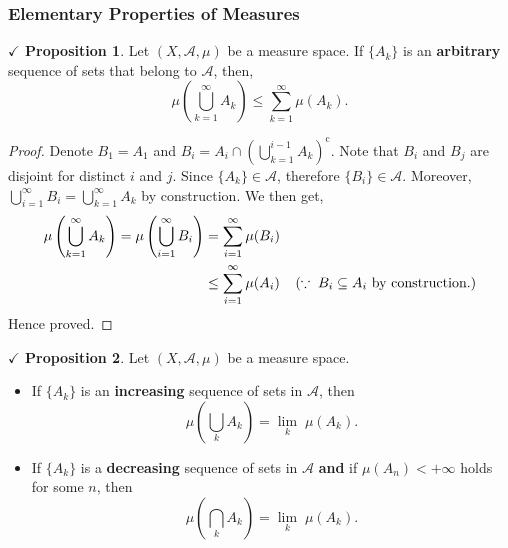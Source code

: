 \documentclass{article}
\theoremstyle{definition}
\theoremstyle{remark}
\theoremstyle{definition}
\theoremstyle{definition}
\newtheorem{proposition}{$\checkmark$ Proposition}
\theoremstyle{definition}
\newcommand{\intrs}{\cap}
\newcommand{\bunion}{\bigcup}
\newcommand{\bintrs}{\bigcap}
\newcommand{\alg}[1]{\mathscr{#1}}
\newcommand{\comp}[1]{#1^{\text{c}}}
\newcommand{\m}[1]{\mu\left (#1\right )}
\newcommand{\limit}[2]{\underset{#1}{\lim}\; #2}
\begin{document}
\subsubsection{Elementary Properties of Measures}
\begin{proposition}
	\label{P-6}
	Let $ (X,\alg{A}, \mu) $ be a measure space. If $ \{A_k\} $ is an \textbf{arbitrary} sequence of sets that belong to $ \alg{A} $, then,
	\[\mu\left (\bunion_{k=1}^\infty A_k\right) \le \sum_{k=1}^\infty \mu(A_k).\]
\end{proposition}
\begin{proof}
	Denote $ B_1 = A_1 $ and $ B_i = A_i \intrs \comp{\left (\bunion_{k=1}^{i-1} A_k \right)} $. Note that $ B_i $ and $ B_j $ are disjoint for distinct $ i $ and $ j $. Since $ \{A_k\}\in \alg{A} $, therefore $ \{B_i\} \in \alg{A}$. Moreover, $ \bunion_{i=1}^{\infty} B_i = \bunion_{k=1}^\infty A_k $ by construction. We then get,
	\begin{equation*}
		\begin{split}
			\mu\left (\bunion_{k=1}^\infty A_k\right ) = \mu\left (\bunion_{i=1}^\infty B_i\right ) &= \sum_{i=1}^\infty \mu(B_i)\\
			&\le \sum_{i=1}^\infty \mu(A_i)\;\;\;\;\text{($ \because \;B_i \subseteq A_i$ by construction.)}
		\end{split}
	\end{equation*}
Hence proved.
\end{proof}
\hrulefill
\newpage
\begin{proposition}
	\label{P-7}
	Let $ (X,\alg{A},\mu) $ be a measure space.
	\begin{itemize}
		\item {If $ \{A_k\} $ is an \textbf{increasing} sequence of sets in $ \alg{A} $, then
	\[\m{\bunion_{k}A_k} = \limit{k}{\m{A_k}}.\]	
	}
\item {If $ \{A_k\} $ is a \textbf{decreasing} sequence of sets in $ \alg{A} $ \textbf{and} if $ \m{A_n} < + \infty$ holds for some $ n $, then
\[\m{\bintrs_k A_k} = \limit{k}{\m{A_k}}.\]
}
	\end{itemize}
\end{proposition}
\end{document}
